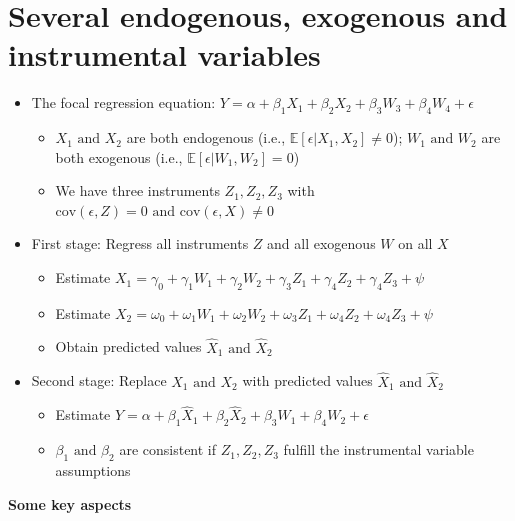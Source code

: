 \documentclass[10pt]{article}
\begin{document}
\section{Several endogenous, exogenous and instrumental variables}
\begin{itemize}
    \item The focal regression equation: $Y = \alpha + \beta_1X_1 + \beta_2X_2 + \beta_3W_3 + \beta_4W_4 + \epsilon $
    \begin{itemize}
        \item $X_1 \text{ and } X_2 $ are both endogenous (i.e., $\mathbb{E}[\epsilon|X_1, X_2]\neq 0 $); $W_1 \text{ and } W_2 $ are both exogenous (i.e., $\mathbb{E}[\epsilon|W_1, W_2] = 0 $)
        \item We have three instruments $Z_1, Z_2, Z_3 $ with $\text{cov}(\epsilon, Z) = 0 \text{ and cov}(\epsilon, X)\neq 0 $
    \end{itemize}
    \item First stage: Regress all instruments $Z $ and all exogenous $W $ on all $X $
    \begin{itemize}
        \item Estimate $X_1 =\gamma_0 + \gamma_1W_1 + \gamma_2W_2 + \gamma_3Z_1 + \gamma_4Z_2 + \gamma_4Z_3 + \psi$
        \item Estimate $X_2 =\omega_0 + \omega_1W_1 + \omega_2W_2 + \omega_3Z_1 + \omega_4Z_2 + \omega_4Z_3 + \psi$
        \item Obtain predicted values $\hat{X}_1 \text{ and }\hat{X}_2 $
    \end{itemize}
    \item Second stage: Replace $X_1\text{ and }X_2 $ with predicted values $\hat{X}_1 \text{ and }\hat{X}_2 $
    \begin{itemize}
        \item Estimate $Y = \alpha + \beta_1\hat{X}_1 + \beta_2\hat{X}_2 + \beta_3W_1 + \beta_4W_2 + \epsilon $
        \item $\beta_1\text{ and }\beta_2 $ are consistent if $Z_1, Z_2, Z_3 $ fulfill the instrumental variable assumptions 
    \end{itemize}
\end{itemize}
\textbf{Some key aspects}
\end{document}
